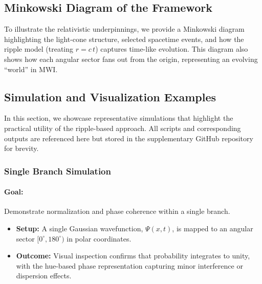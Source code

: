 \subsection{Minkowski Diagram of the Framework}
To illustrate the relativistic underpinnings, we provide a Minkowski diagram highlighting the light-cone structure, selected spacetime events, and how the ripple model (treating \(r = c\,t\)) captures time-like evolution. This diagram also shows how each angular sector fans out from the origin, representing an evolving “world” in MWI.


\subsection{Simulation and Visualization Examples}

In this section, we showcase representative simulations that highlight the practical utility of the ripple-based approach. All scripts and corresponding outputs are referenced here but stored in the supplementary GitHub repository for brevity.

\subsubsection{Single Branch Simulation}
\paragraph{Goal:} Demonstrate normalization and phase coherence within a single branch.
\begin{itemize}
    \item \textbf{Setup:} A single Gaussian wavefunction, \(\Psi(x,t)\), is mapped to an angular sector \([0^\circ,180^\circ)\) in polar coordinates.
    \item \textbf{Outcome:} Visual inspection confirms that probability integrates to unity, with the hue-based phase representation capturing minor interference or dispersion effects.
\end{itemize}

